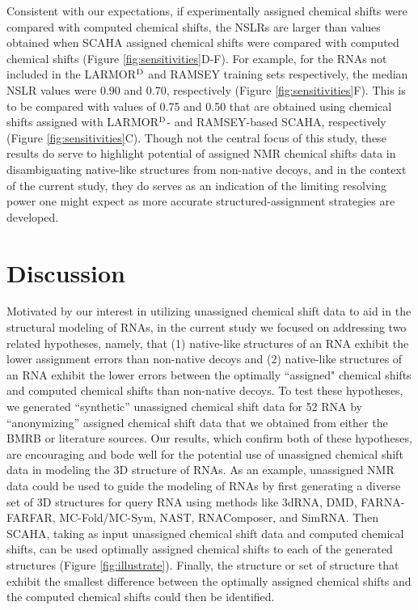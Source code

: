 \documentclass[journal=jcisd8,manuscript=article,layout=onecolumn]{achemso}
\begin{document}
{Consistent with our expectations, if experimentally assigned chemical shifts were compared with computed chemical shifts, the NSLRs are larger than values obtained when SCAHA assigned chemical shifts were compared with computed chemical shifts (Figure  \ref{fig:sensitivities}D-F). For example, for the RNAs not included in the LARMOR$^{\rm D}$ and RAMSEY training sets respectively, the median NSLR values were 0.90 and 0.70, respectively (Figure  \ref{fig:sensitivities}F). This is to be compared with values of 0.75 and 0.50 that are obtained using chemical shifts assigned with LARMOR$^{\rm D}$- and RAMSEY-based SCAHA, respectively (Figure  \ref{fig:sensitivities}C). Though not the central focus of this study, these results do serve to highlight potential of assigned NMR chemical shifts data in disambiguating native-like structures from non-native decoys, and in the context of the current study, they do serves as an indication of the limiting resolving power one might expect as more accurate structured-assignment strategies are developed.

\section{Discussion} 
Motivated by our interest in utilizing unassigned chemical shift data to aid in the structural modeling of RNAs, in the current study we focused on addressing two related hypotheses, namely, that (1) native-like structures of an RNA exhibit the lower assignment errors than non-native decoys and (2)  native-like structures of an RNA exhibit the lower errors between the optimally ``assigned" chemical shifts and computed chemical shifts than non-native decoys. To test these hypotheses, we generated ``synthetic'' unassigned chemical shift data for 52 RNA by ``anonymizing'' assigned chemical shift data that we obtained from either the BMRB or literature sources. Our results, which confirm both of these hypotheses, are encouraging and bode well for the potential use of unassigned chemical shift data in modeling the 3D structure of RNAs. As an example, unassigned NMR data could be used to guide the modeling of RNAs by first generating a diverse set of 3D structures for query RNA using methods like 3dRNA\cite{zhao2012automated}, DMD\cite{proctor2011discrete}, FARNA-FARFAR\cite{das2007automated, das2010atomic}, MC-Fold/MC-Sym\cite{parisien2008mc}, NAST\cite{jonikas2009coarse, jonikas2009knowledge}, RNAComposer\cite{popenda2012automated}, and SimRNA\cite{boniecki2016simrna}. Then SCAHA, taking as input unassigned chemical shift data and computed chemical shifts, can be used optimally assigned chemical shifts to each of the generated structures (Figure \ref{fig:illustrate}). Finally, the structure or set of structure that exhibit the smallest difference between the optimally assigned chemical shifts and the computed chemical shifts could then be identified. 

}
\end{document}

